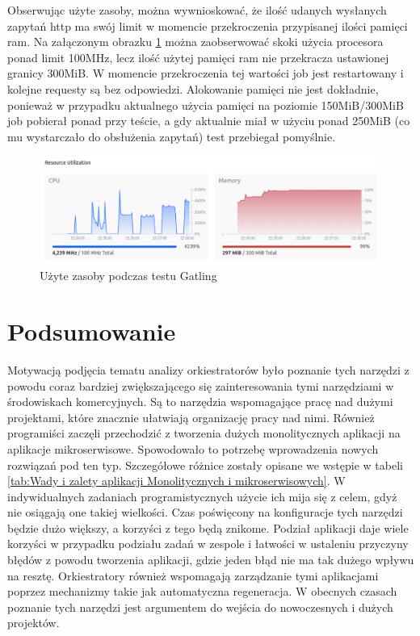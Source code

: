 \documentclass{iiuwb}
\begin{document}
Obserwując użyte zasoby, można wywnioskować, że ilość udanych
wysłanych zapytań http ma swój limit w momencie przekroczenia 
przypisanej ilości pamięci ram. Na załączonym obrazku 
\ref{fig: Uzyte zasoby podczas testu Gatling} można zaobserwować 
skoki użycia procesora ponad limit 100MHz, lecz ilość użytej 
pamięci ram nie przekracza ustawionej granicy 300MiB. W momencie 
przekroczenia tej wartości job jest restartowany i kolejne 
requesty są bez odpowiedzi. 
Alokowanie pamięci nie jest dokładnie, ponieważ w przypadku 
aktualnego użycia pamięci na poziomie 150MiB/300MiB job 
pobierał ponad przy teście, a gdy aktualnie miał w użyciu 
ponad 250MiB (co mu wystarczało do obsłużenia zapytań) test 
przebiegał pomyślnie.

\begin{figure}[!h]
  \centering
  \includegraphics[width=12cm]{nomad/nomadGatlingTest.pdf}
  \caption{Użyte zasoby podczas testu Gatling}
  \label{fig: Uzyte zasoby podczas testu Gatling}
\end{figure}

\cleardoublepage
\chapter*{Podsumowanie}
\label{cha:Podsumowanie}


Motywacją podjęcia tematu analizy orkiestratorów było 
poznanie tych narzędzi z powodu coraz bardziej zwiększającego 
się zainteresowania tymi narzędziami w środowiskach komercyjnych. 
Są to narzędzia wspomagające pracę nad dużymi projektami, które 
znacznie ułatwiają organizację pracy nad nimi. Również programiści 
zaczęli przechodzić z tworzenia dużych monolitycznych aplikacji 
na aplikacje mikroserwisowe. Spowodowało to potrzebę wprowadzenia 
nowych rozwiązań pod ten typ. Szczegółowe różnice zostały opisane 
we wstępie w tabeli \ref{tab:Wady i zalety aplikacji Monolitycznych i mikroserwisowych}. 
W indywidualnych zadaniach programistycznych użycie ich mija się 
z celem, gdyż nie osiągają one takiej wielkości. Czas poświęcony na 
konfiguracje tych narzędzi będzie dużo większy, a korzyści z tego 
będą znikome. Podział aplikacji daje wiele korzyści w przypadku podziału 
zadań w zespole i łatwości w ustaleniu przyczyny błędów z powodu 
tworzenia aplikacji, gdzie jeden błąd nie ma tak dużego wpływu na resztę. 
Orkiestratory również wspomagają zarządzanie tymi aplikacjami poprzez 
mechanizmy takie jak automatyczna regeneracja. W obecnych czasach 
poznanie tych narzędzi jest argumentem do wejścia do nowoczesnych 
i dużych projektów.
\newline
\end{document}
